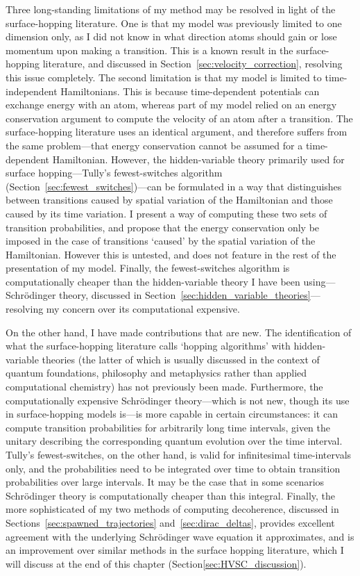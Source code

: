 Three long-standing limitations of my method may be resolved in light of the surface-hopping literature. One is that my model was previously limited to one dimension only, as I did not know in what direction atoms should gain or lose momentum upon making a transition. This is a known result in the surface-hopping literature, and discussed in Section~\ref{sec:velocity_correction}, resolving this issue completely. The second limitation is that my model is limited to time-independent Hamiltonians. This is because time-dependent potentials can exchange energy with an atom, whereas part of my model relied on an energy conservation argument to compute the velocity of an atom after a transition. The surface-hopping literature uses an identical argument, and therefore suffers from the same problem---that energy conservation cannot be assumed for a time-dependent Hamiltonian. However, the hidden-variable theory primarily used for surface hopping---Tully's fewest-switches algorithm (Section~\ref{sec:fewest_switches})---can be formulated in a way that distinguishes between transitions caused by spatial variation of the Hamiltonian and those caused by its time variation. I present a way of computing these two sets of transition probabilities, and propose that the energy conservation only be imposed in the case of transitions `caused' by the spatial variation of the Hamiltonian. However this is untested, and does not feature in the rest of the presentation of my model. Finally, the fewest-switches algorithm is computationally cheaper than the hidden-variable theory I have been using---Schr\"odinger theory, discussed in Section~\ref{sec:hidden_variable_theories}---resolving my concern over its computational expensive.

On the other hand, I have made contributions that are new. The identification of what the surface-hopping literature calls `hopping algorithms' with hidden-variable theories (the latter of which is usually discussed in the context of quantum foundations, philosophy and metaphysics rather than applied computational chemistry) has not previously been made. Furthermore, the computationally expensive Schr\"odinger theory---which is not new, though its use in surface-hopping models is---is more capable in certain circumstances: it can compute transition probabilities for arbitrarily long time intervals, given the unitary describing the corresponding quantum evolution over the time interval. Tully's fewest-switches, on the other hand, is valid for infinitesimal time-intervals only, and the probabilities need to be integrated over time to obtain transition probabilities over large intervals. It may be the case that in some scenarios Schr\"odinger theory is computationally cheaper than this integral. Finally, the more sophisticated of my two methods of computing decoherence, discussed in Sections~\ref{sec:spawned_trajectories} and~\ref{sec:dirac_deltas}, provides excellent agreement with the underlying Schr\"odinger wave equation it approximates, and is an improvement over similar methods in the surface hopping literature, which I will discuss at the end of this chapter (Section\ref{sec:HVSC_discussion}).

